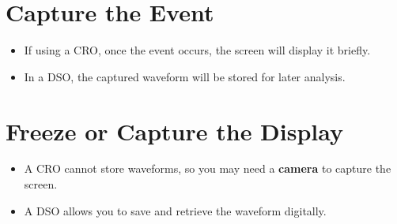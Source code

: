 \documentclass{article}
\begin{document}
\section{Capture the Event}
\begin{itemize}
    \item If using a CRO, once the event occurs, the screen will display it briefly.
    \item In a DSO, the captured waveform will be stored for later analysis.
\end{itemize}

\section{Freeze or Capture the Display}
\begin{itemize}
    \item A CRO cannot store waveforms, so you may need a \textbf{camera} to capture the screen.
    \item A DSO allows you to save and retrieve the waveform digitally.
\end{itemize}
\end{document}
